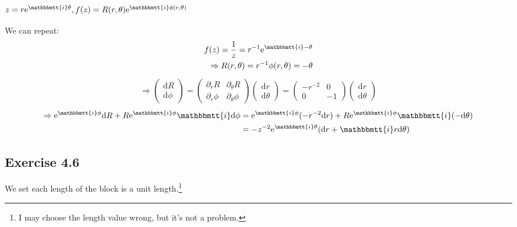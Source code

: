 \documentclass[]{ctexart}
\newcommand{\mi}{\mathbbmtt{i}}
\newcommand{\di}{\mathrm{d}}
\newcommand{\pa}{\partial}
\newcommand{\me}{\mathrm{e}}
\begin{document}
		\subsubsection{$z=r\me ^{\mi \theta},f(z)=R(r,\theta)\me ^{\mi \phi(r,\theta)}$}
			We can repeat:
				\begin{equation*}
				\begin{aligned}
					f(z)=\frac{1}{z}=r^{-1}\me ^{\mi -\theta}\\
					\Rightarrow R(r,\theta)=r^{-1} \phi(r,\theta)=-\theta
				\end{aligned}
				\end{equation*}
				\begin{equation*}
				\begin{aligned}
					\Rightarrow
					\begin{pmatrix}
						\di R\\
						\di \phi
					\end{pmatrix}
					=
					\begin{pmatrix}
						\pa_rR & \pa_{\theta}R\\
						\pa_r\phi & \pa_{\theta}\phi
					\end{pmatrix}
					\begin{pmatrix}
						\di r\\
						\di \theta
					\end{pmatrix}
					=
					\begin{pmatrix}
						-r^{-2} & 0\\
						0 & -1
					\end{pmatrix}
					\begin{pmatrix}
						\di r\\
						\di \theta
					\end{pmatrix}
				\end{aligned}
				\end{equation*}
				\begin{equation*}
				\begin{aligned}
					\Rightarrow \me ^{\mi \phi }\di R+R\me ^{\mi \phi}\mi \di \phi&=\me ^{\mi \phi }(-r^{-2}\di r)+R\me ^{\mi \phi}\mi(-\di \theta)\\
					&=-z^{-2}\me ^{\mi\theta}(\di r +\mi r\di \theta)
				\end{aligned}
				\end{equation*}
	
	\subsection{Exercise 4.6}
		We set each length of the block is a unit length.\footnote{I may choose the length value wrong, but it's not a problem. }
	
\end{document}
